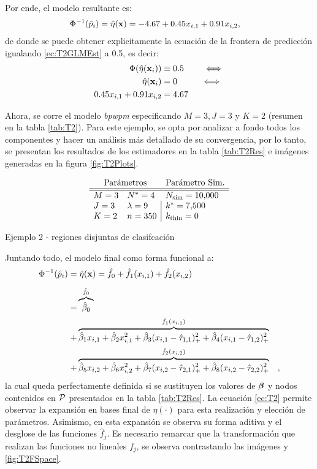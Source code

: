 \documentclass[../Main/Main.tex]{subfiles}
\begin{document}
Por ende, el modelo resultante es:
\begin{align}
 \Phi^{-1}(\hat{p}_i) &= \hat{\eta}(\xsn) = -4.67 + 0.45x_{i,1} + 0.91x_{i,2}, \label{ec:T2GLMEst}
\end{align}
de donde se puede obtener explicitamente la ecuación de la frontera de predicción igualando \eqref{ec:T2GLMEst} a 0.5, es decir:
\begin{align}
	\Phi(\hat{\eta}(\xni)) &\equiv 0.5 \qquad \iff \nonumber \\
	\hat{\eta}(\xni) &= 0 \;\;\qquad \iff  \nonumber \\
	0.45x_{i,1} + 0.91x_{i,2} &= 4.67  \label{ec:T2RectaGLM}
\end{align}

Ahora, se corre el modelo \textit{bpwpm} especificando $M = 3, J = 3$ y $K =2$ (resumen en la tabla \ref{tab:T2}). Para este ejemplo, se opta por analizar a fondo todos los componentes y hacer un análisis más detallado de su convergencia, por lo tanto, se presentan los resultados de los estimadores en la tabla \ref{tab:T2Res} e imágenes generadas en la figura \ref{fig:T2Plots}.
\begin{table}[h]
$$\paramsmod{3}{3}{2}{4}{9}{350}{\num{10000}}{\num{7500}}{0}$$
\caption{Ejemplo 2 - regiones disjuntas de clasifcación}
\label{tab:T2}
\end{table}

Juntando todo, el modelo final como forma funcional a:
\begin{align}
	\Phi^{-1}(\hat{p}_i) = &\; \hat{\eta}(\xsn) = \hat{f}_0 + \hat{f}_1(x_{i,1}) +  \hat{f}_2(x_{i,2}) \label{ec:T2}\\[5pt]	
	= & \overbrace{\hat{\beta}_0}^{\hat{f}_0} \nonumber \\ 
	+ & \overbrace{\hat{\beta}_1x_{i,1} + \hat{\beta}_2x_{i,1}^2 
+ \hat{\beta}_3(x_{i,1} - \hat{\t}_{1,1})_+^2 + \hat{\beta}_4(x_{i,1} - \hat{\t}_{1,2})_+^2}^{\hat{f}_1(x_{i,1})} \nonumber \\
	+ & \overbrace{\hat{\beta}_5x_{i,2} + \hat{\beta}_6x_{i,2}^2 
+ \hat{\beta}_7(x_{i,2} - \hat{\t}_{2,1})_+^2 + \hat{\beta}_8(x_{i,2} - \hat{\t}_{2,2})_+^2}^{\hat{f}_2(x_{i,2})}\quad, \nonumber
\end{align}
la cual queda perfectamente definida si se sustituyen los valores de $\betabf$ y nodos contenidos en $\P$ presentados en la tabla \ref{tab:T2Res}. La ecuación \eqref{ec:T2} permite observar la expansión en bases final de $\eta(\cdot)$ para esta realización y elección de parámetros. Asimismo, en esta expansión se observa su forma aditiva y el desglose de las funciones $\hat{f}_j$. Es necesario remarcar que la transformación que realizan las funciones no lineales $f_j$, se observa contrastando las imágenes  y \ref{fig:T2FSpace}.
\end{document}
